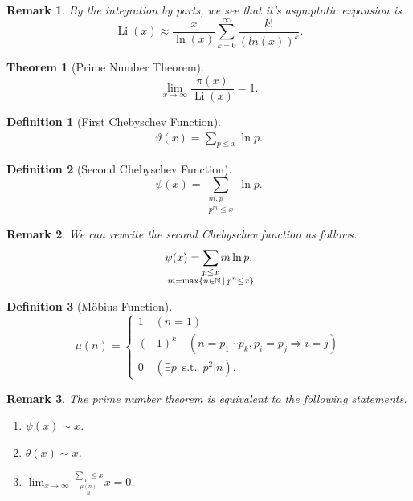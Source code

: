 \documentclass{article}
\newtheorem{theorem}{Theorem} [section]
\newtheorem{definition}{Definition}[section]
\newtheorem{remark}{Remark}[section]
\DeclareMathOperator{\straw}{s.t.}
\DeclareMathOperator{\Li}{Li}
\newcommand{\N}[0]{\mathbb{N}}
\newcommand{\sep}[0]{\:|\:}
\newcommand{\st}[0]{\:\straw\:}
\begin{document}
\begin{remark}
By the integration by parts, we see that it's asymptotic expansion is 
\begin{equation*}
\Li(x) \approx {\frac x {\ln(x)}}\sum_{k=0}^\infty {\frac {k!} {(ln(x))^k}}.
\end{equation*}
\end{remark}

\begin{theorem}[Prime Number Theorem]
\begin{equation*}
\lim_{x\to \infty}{\frac {\pi(x)} {\Li(x)}} = 1.
\end{equation*}
\end{theorem}

\begin{definition}[First Chebyschev Function]
\begin{align*}
\vartheta(x) = \sum_{p\leq x}\ln p.
\end{align*} 
\end{definition}

\begin{definition}[Second Chebyschev Function]
  \label{definition_second_chebyschev}
\begin{equation*}
\psi(x) = \sum_{\substack{m,p\\ p^m\leq x}}\ln p.
\end{equation*}
\end{definition}

\begin{remark}
  We can rewrite the second Chebyschev function as follows.
  \begin{equation*}
    \psi(x) = \sum_{\mathmakebox[0pt][c]{\substack{p\leq x\\ m=\max\{n\in\N\sep p^n\leq x\}}}}m\ln p.
  \end{equation*}
\end{remark}

\begin{definition}[Möbius Function]
\begin{equation*}
\mu(n) = 
\begin{cases}
1\quad (n=1)\\
(-1)^k \quad (n=p_1\cdots p_k, p_i=p_j\Rightarrow i=j)\\
0 \quad (\exists p\st p^2|n).
\end{cases}
\end{equation*}
\end{definition}

\begin{remark}
  \label{remark_prime_number_theorem_equivalence}
The prime number theorem is equivalent to the following statements.
\begin{enumerate}[1).]
\item $\psi(x)\sim x$.
\item $\theta(x)\sim x$.
\item $\lim_{x\to\infty} {\frac {\sum_n\leq x} {\frac {\mu(n)} n} {x}} = 0$.
\end{enumerate}
\end{remark}
\end{document}
